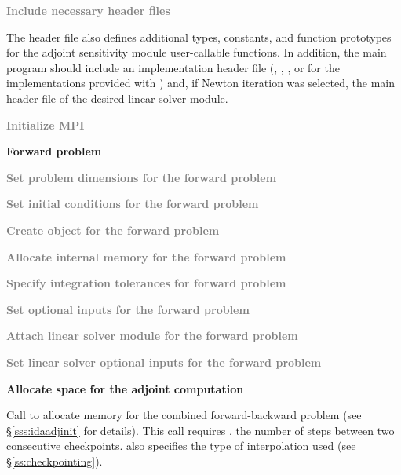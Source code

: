 \begin{Steps}

\item
  \textcolor{gray}{\bf Include necessary header files}
  
  The  header file also defines additional types, constants, and
  function prototypes for the adjoint sensitivity module user-callable functions.
  In addition, the main program should include an {\nvector} 
  implementation header file (,
  , , or 
  for the implementations provided with {\idas}) and, if Newton iteration 
  was selected, the main header file of the desired linear solver module.

\item
  \textcolor{gray}{\bf {\p} Initialize MPI}

  \vspace{0.2in}\centerline{\bf Forward problem}

\item
  \textcolor{gray}{\bf Set problem dimensions for the forward problem}

\item
  \textcolor{gray}{\bf Set initial conditions for the forward problem}

\item
  \textcolor{gray}{\bf Create {\idas} object for the forward problem}

\item
  \textcolor{gray}{\bf Allocate internal memory for the forward problem}

\item
  \textcolor{gray}{\bf Specify integration tolerances for forward problem}

\item
  \textcolor{gray}{\bf Set optional inputs for the forward problem}

\item
  \textcolor{gray}{\bf Attach linear solver module for the forward problem}

\item
  \textcolor{gray}{\bf Set linear solver optional inputs for the forward problem}

\item
  {\bf Allocate space for the adjoint computation}

  Call \id{()} to allocate memory for the 
  combined forward-backward problem (see \S\ref{sss:idaadjinit} for details).
  This call requires , the number of steps between two consecutive checkpoints.
   also specifies the type of interpolation used 
  (see \S\ref{ss:checkpointing}).


\end{Steps}
